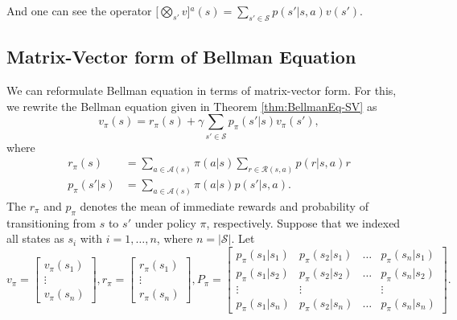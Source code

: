     And one can see the operator $\Big[\bigotimes_{s'} v\Big]{}^a(s) = \sum_{s' \in \mathcal{S}} p(s'|s,a) v(s')$.

    \subsection{Matrix-Vector form of Bellman Equation}
        We can reformulate Bellman equation in terms of matrix-vector form. For this, we rewrite the Bellman equation given in Theorem \ref{thm:BellmanEq-SV} as
        \begin{equation}
            v_\pi(s) = r_\pi(s) + \gamma\sum_{s' \in \mathcal{S}}p_\pi(s'|s)v_\pi(s'),
        \end{equation}
        where
        \begin{align}
            r_\pi(s) &= \sum_{a \in \mathcal{A}(s)}\pi(a|s)\sum_{r \in \mathcal{R}(s,a)}p(r|s,a)r \\
            p_\pi(s'|s) &= \sum_{a \in \mathcal{A}(s)}\pi(a|s)p(s'|s,a).
        \end{align}
        The $r_\pi$ and $p_\pi$ denotes the mean of immediate rewards and probability of transitioning from $s$ to $s'$ under policy $\pi$, respectively.
        Suppose that we indexed all states as $s_i$ with $i = 1, \dots, n$, where $n=|\mathcal{S}|$.
        Let
        \begin{equation}
            v_\pi = \begin{bmatrix}
                    v_\pi(s_1) \\
                    \vdots \\
                    v_\pi(s_n)
                    \end{bmatrix},
            r_\pi = \begin{bmatrix}
                    r_\pi(s_1) \\
                    \vdots \\
                    r_\pi(s_n)
                    \end{bmatrix},
            P_\pi = \begin{bmatrix}
                    p_\pi(s_1|s_1) & p_\pi(s_2|s_1) & \dots & p_\pi(s_n|s_1) \\
                    p_\pi(s_1|s_2) & p_\pi(s_2|s_2) & \dots & p_\pi(s_n|s_2) \\
                    \vdots & \vdots &  & \vdots \\
                    p_\pi(s_1|s_n) & p_\pi(s_2|s_n) & \dots & p_\pi(s_n|s_n)
                    \end{bmatrix}. \label{eq:VecForm}
        \end{equation}
